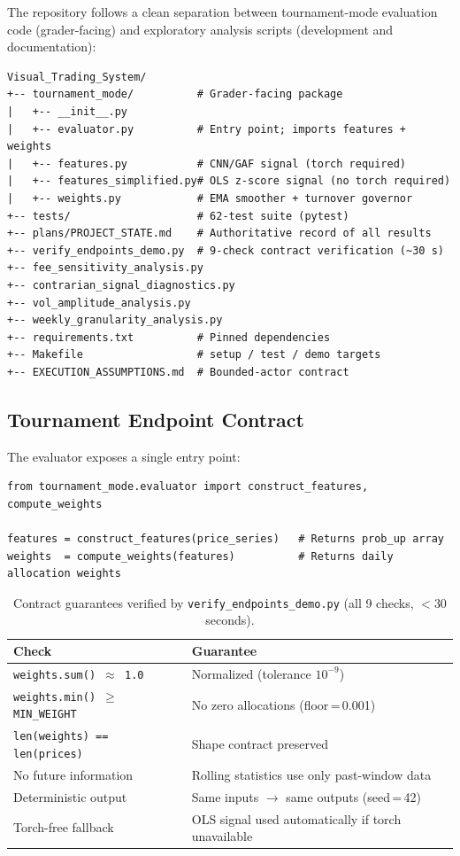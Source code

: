 \documentclass[11pt,letterpaper]{article}
\begin{document}
The repository follows a clean separation between tournament-mode evaluation
code (grader-facing) and exploratory analysis scripts (development and
documentation):

\begin{lstlisting}[style=bash, caption={Repository structure.}]
Visual_Trading_System/
+-- tournament_mode/          # Grader-facing package
|   +-- __init__.py
|   +-- evaluator.py          # Entry point; imports features + weights
|   +-- features.py           # CNN/GAF signal (torch required)
|   +-- features_simplified.py# OLS z-score signal (no torch required)
|   +-- weights.py            # EMA smoother + turnover governor
+-- tests/                    # 62-test suite (pytest)
+-- plans/PROJECT_STATE.md    # Authoritative record of all results
+-- verify_endpoints_demo.py  # 9-check contract verification (~30 s)
+-- fee_sensitivity_analysis.py
+-- contrarian_signal_diagnostics.py
+-- vol_amplitude_analysis.py
+-- weekly_granularity_analysis.py
+-- requirements.txt          # Pinned dependencies
+-- Makefile                  # setup / test / demo targets
+-- EXECUTION_ASSUMPTIONS.md  # Bounded-actor contract
\end{lstlisting}

\subsection{Tournament Endpoint Contract}

The evaluator exposes a single entry point:
\begin{lstlisting}[style=python, caption={Tournament entry point usage.}]
from tournament_mode.evaluator import construct_features, compute_weights

features = construct_features(price_series)   # Returns prob_up array
weights  = compute_weights(features)          # Returns daily allocation weights
\end{lstlisting}

\begin{table}[H]
  \centering
  \caption{Contract guarantees verified by \texttt{verify\_endpoints\_demo.py}
           (all 9 checks, $<$30 seconds).}
  \label{tab:contract}
  \begin{tabular}{ll}
    \toprule
    \textbf{Check} & \textbf{Guarantee} \\
    \midrule
    \texttt{weights.sum() $\approx$ 1.0} & Normalized (tolerance $10^{-9}$) \\
    \texttt{weights.min() $\geq$ MIN\_WEIGHT} & No zero allocations (floor\,=\,0.001) \\
    \texttt{len(weights) == len(prices)} & Shape contract preserved \\
    No future information & Rolling statistics use only past-window data \\
    Deterministic output  & Same inputs $\to$ same outputs (seed\,=\,42) \\
    Torch-free fallback   & OLS signal used automatically if torch unavailable \\
    \bottomrule
  \end{tabular}
\end{table}
\end{document}
